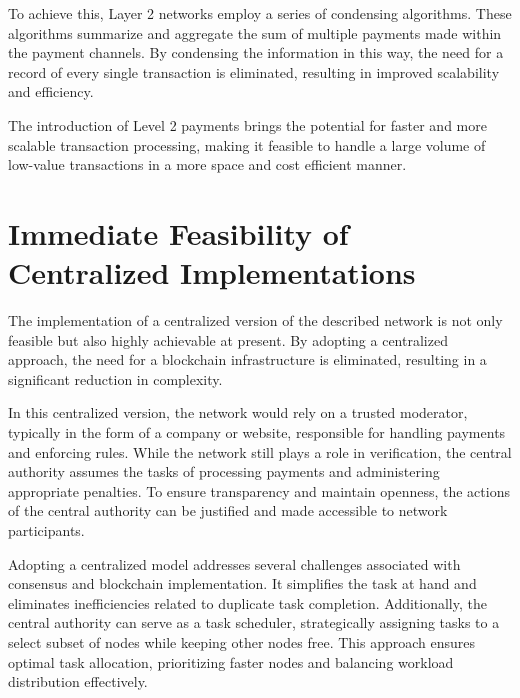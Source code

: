 \documentclass{article}
\begin{document}
To achieve this, Layer 2 networks employ a series of condensing algorithms. 
These algorithms summarize and aggregate the sum of multiple payments made within the payment channels. 
By condensing the information in this way, the need for a record of every single transaction is eliminated, resulting in improved scalability and efficiency.

The introduction of Level 2 payments brings the potential for faster and more scalable transaction processing, making it feasible to handle a large volume of low-value transactions in a more space and cost efficient manner.

\section{Immediate Feasibility of Centralized Implementations}
The implementation of a centralized version of the described network is not only feasible but also highly achievable at present. 
By adopting a centralized approach, the need for a blockchain infrastructure is eliminated, resulting in a significant reduction in complexity.

In this centralized version, the network would rely on a trusted moderator, typically in the form of a company or website, responsible for handling payments and enforcing rules. 
While the network still plays a role in verification, the central authority assumes the tasks of processing payments and administering appropriate penalties. 
To ensure transparency and maintain openness, the actions of the central authority can be justified and made accessible to network participants.

Adopting a centralized model addresses several challenges associated with consensus and blockchain implementation. It simplifies the task at hand and eliminates inefficiencies related to duplicate task completion. 
Additionally, the central authority can serve as a task scheduler, strategically assigning tasks to a select subset of nodes while keeping other nodes free. 
This approach ensures optimal task allocation, prioritizing faster nodes and balancing workload distribution effectively.
\end{document}
